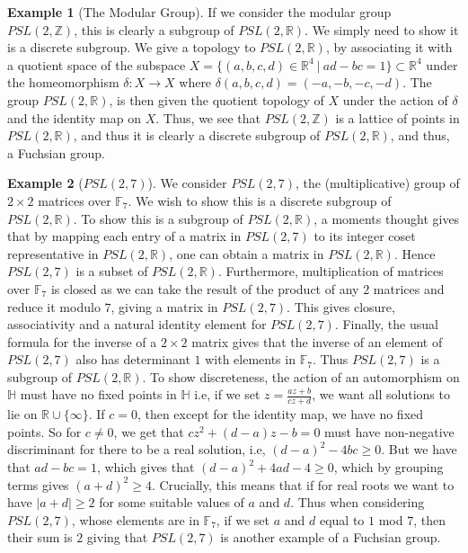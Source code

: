 \documentclass[11pt]{report}
\theoremstyle{definition}
\newtheorem*{example*}{Example}
\begin{document}
\begin{example*}[The Modular Group]
  If we consider the modular group $PSL(2,\mathbb{Z})$, this is clearly a subgroup of $PSL(2,\mathbb{R})$. We simply need to show it is a discrete subgroup. We give a topology to $PSL(2,\mathbb{R})$, by associating it with a quotient space of the subspace $X = \{(a, b, c, d) \in \mathbb{R}^4 \ \vert \ ad-bc=1 \} \subset \mathbb{R}^4$ under the homeomorphism $\delta: X \rightarrow X$ where $\delta(a, b, c, d) = (-a, -b, -c, -d)$. The group $PSL(2,\mathbb{R})$, is then given the quotient topology of $X$ under the action  of $\delta$ and the identity map on $X$. Thus, we see that $PSL(2,\mathbb{Z})$ is a lattice of points in $PSL(2,\mathbb{R})$, and thus it is clearly a discrete subgroup of $PSL(2,\mathbb{R})$, and thus, a Fuchsian group.
\end{example*}
\begin{example*}[$PSL(2,7)$]
  We consider $PSL(2,7)$, the (multiplicative) group of $2\times 2$ matrices over $\mathbb{F}_7$. We wish to show this is a discrete subgroup of $PSL(2,\mathbb{R})$. To show this is a subgroup of $PSL(2,\mathbb{R})$, a moments thought gives that by mapping each entry of a matrix in $PSL(2,7)$ to its integer coset representative in $PSL(2,\mathbb{R})$, one can obtain a matrix in $PSL(2,\mathbb{R})$. Hence $PSL(2,7)$ is a subset of $PSL(2,\mathbb{R})$. Furthermore, multiplication of matrices over $\mathbb{F}_7$ is closed as we can take the result of the product of any $2$ matrices and reduce it modulo $7$, giving a matrix in $PSL(2,7)$. This gives closure, associativity and a natural identity element for $PSL(2,7)$. Finally, the usual formula for the inverse of a $2\times 2$ matrix gives that the inverse of an element of $PSL(2,7)$ also has determinant $1$ with elements in $\mathbb{F}_7$. Thus $PSL(2,7)$ is a subgroup of $PSL(2,\mathbb{R})$. 
  To show discreteness, the action of an automorphism on $\mathbb{H}$ must have no fixed points in $\mathbb{H}$ i.e, if we set $z = \frac{az+b}{cz+d}$, we want all solutions to lie on $\mathbb{R} \cup \{\infty\}$. If $c = 0$, then except for the identity map, we have no fixed points. So for $c \neq 0$, we get that $cz^2 + (d-a)z - b = 0$ must have non-negative discriminant for there to be a real solution, i.e, $(d-a)^2 - 4bc \geq 0$. But we have that $ad-bc = 1$, which gives that $(d-a)^2 +4ad -4 \geq 0$, which by grouping terms gives $(a + d)^2 \geq 4$. Crucially, this means that if for real roots we want to have $\vert a + d \vert \geq 2$ for some suitable values of $a$ and $d$. Thus when considering $PSL(2,7)$, whose elements are in $\mathbb{F}_7$, if we set $a$ and $d$ equal to $1$ mod $7$, then their sum is $2$ giving that $PSL(2,7)$ is another example of a Fuchsian group.
\end{example*}
\end{document}

